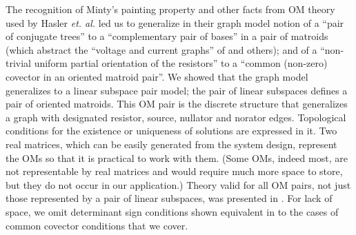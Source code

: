 \documentclass{article}
\newcommand{\extra}[1]{}
\begin{document}
\extra{Preliminary connections between our approach and the 
issue of DC operating point stability \cite{Green} were published
\cite{sdcISCAS98}, but relating these determinant based results
to common covectors is still under investigation.}

The recognition of Minty's painting property\cite{VandewalleChua} 
and other facts
from OM
theory used by Hasler \textit{et. al.} 
\cite{HaslerNeirynck,Fosseprez,HaslerDApplMath} led us to 
generalize in \cite{sdcOMP}
their graph model notion of a ``pair of 
conjugate trees''
to a ``complementary pair of bases''
in a pair of matroids (which abstract the ``voltage and current graphs''
of \cite{Recski} and others); and of 
a ``non-trivial uniform partial orientation of the resistors''
to a ``common (non-zero) covector in an oriented matroid pair''.   
We showed that the graph model 
generalizes to a linear subspace pair model;
the pair of linear subspaces defines a pair of oriented matroids.
This OM pair is the discrete structure that
generalizes a graph with designated resistor, source, nullator
and norator edges.
Topological conditions
for the existence or uniqueness of solutions
are expressed in it. 
Two real matrices, which can be easily generated
from the system design, represent the OMs so that 
it is practical to work with them.  (Some OMs, indeed 
most, are not representable by real matrices and would require much more
space to store, but they do not occur in our application.)
Theory valid for all OM pairs, not just those represented by
a pair of linear subspaces, was presented in \cite{sdcOMP}.  For lack of
space, we omit determinant sign conditions shown equivalent
in \cite{sdcOMP} to the cases of common covector conditions that we cover.


\extra{

In the electrical circuit theory literature, the circuit ``topology''
means the network graph (to which Kirchhoff's laws apply)
together with particular kinds of ``device elements''
such as resistors, capacitors, voltage sources (batteries), 
current sources, etc., associated with single graph edges, and possibly
``multiport'' elements associated with multiple graph edges.
Problems with multiport elements are reduced to 
those with only single edge elements, in order to apply
the theory of  \cite{HaslerDApplMath},  through the use of 
``nullator'' and ``norator'' elements.  Detailed exposition of the problems,
reductions, theory and applications is given in \cite{HaslerNeirynck}.

}
\end{document}
